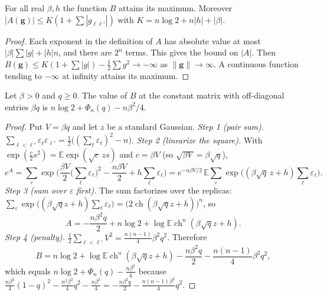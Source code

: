 \begin{lemma}\label{lem:sg-tal:replica-existence}
\leanok
{}
For all real $\beta,h$ the function $B$ attains its maximum. Moreover $|A(\mathbf g)|\le K(1+\sum|g_{\ell\ell'}|)$ with $K=n\log2+n|h|+|\beta|$.
\end{lemma}
\begin{proof}
\leanok
Each exponent in the definition of $A$ has absolute value at most $|\beta|\sum|g|+|h|n$, and there are $2^n$ terms. This gives the bound on $|A|$.
Then $B(\mathbf g)\le K(1+\sum|g|)-\frac12\sum g^2\to-\infty$ as $\|\mathbf g\|\to\infty$. A continuous function tending to $-\infty$ at infinity attains its maximum.
\end{proof}

\begin{lemma}\label{lem:sg-tal:replica-constant}
\leanok
{}
Let $\beta>0$ and $q\ge0$. The value of $B$ at the constant matrix with off-diagonal entries $\beta q$ is $n\log2+\Phi_n(q)-n\beta^2/4$.
\end{lemma}
\begin{proof}
\leanok
Put $V=\beta q$ and let $z$ be a standard Gaussian.
\emph{Step 1 (pair sum).} $\sum_{\ell<\ell'}\varepsilon_\ell\varepsilon_{\ell'}=\frac12\big((\sum_\ell\varepsilon_\ell)^2-n\big)$.
\emph{Step 2 (linearize the square).} With $\exp(\frac c2s^2)=\mathbb E\exp(\sqrt c\,zs)$ and $c=\beta V$ (so $\sqrt{\beta V}=\beta\sqrt q$),
\[
e^{A}=\sum_{\varepsilon}\exp\Big(\frac{\beta V}2\Big(\sum_\ell\varepsilon_\ell\Big)^2-\frac{n\beta V}2+h\sum_\ell\varepsilon_\ell\Big)=e^{-n\beta V/2}\,\mathbb E\sum_\varepsilon\exp\Big((\beta\sqrt q\,z+h)\sum_\ell\varepsilon_\ell\Big).
\]
\emph{Step 3 (sum over $\varepsilon$ first).} The sum factorizes over the replicas: $\sum_\varepsilon\exp\big((\beta\sqrt qz+h)\sum_\ell\varepsilon_\ell\big)=\big(2\operatorname{ch}(\beta\sqrt qz+h)\big)^n$, so
\[
A=-\frac{n\beta^2q}2+n\log2+\log\mathbb E\operatorname{ch}^n(\beta\sqrt qz+h).
\]
\emph{Step 4 (penalty).} $\frac12\sum_{\ell<\ell'}V^2=\frac{n(n-1)}4\beta^2q^2$. Therefore
\[
B=n\log2+\log\mathbb E\operatorname{ch}^n(\beta\sqrt qz+h)-\frac{n\beta^2q}2-\frac{n(n-1)}4\beta^2q^2 ,
\]
which equals $n\log2+\Phi_n(q)-\frac{n\beta^2}4$ because $\frac{n\beta^2}4(1-q)^2-\frac{n^2\beta^2}4q^2-\frac{n\beta^2}4=-\frac{n\beta^2q}2-\frac{n(n-1)\beta^2}4q^2$.
\end{proof}

